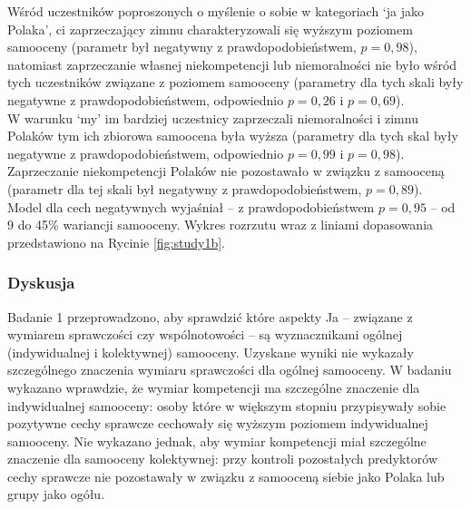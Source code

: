 \documentclass[man]{apa6}
\begin{document}
Wśród uczestników poproszonych o myślenie o sobie w kategoriach `ja jako Polaka', ci zaprzeczający zimnu charakteryzowali się wyższym poziomem samooceny (parametr był negatywny z prawdopodobieństwem, $p = 0,98$), natomiast zaprzeczanie własnej niekompetencji lub niemoralności nie było wśród tych uczestników związane z poziomem samooceny  (parametry dla tych skali były negatywne z prawdopodobieństwem, odpowiednio $p = 0,26$ i $p = 0,69$).\\

W warunku `my' im bardziej uczestnicy zaprzeczali niemoralności i zimnu Polaków tym ich zbiorowa samoocena była wyższa (parametry dla tych skal były negatywne z prawdopodobieństwem, odpowiednio $p = 0,99$ i $p = 0,98$). Zaprzeczanie niekompetencji Polaków nie pozostawało w związku z samooceną (parametr dla tej skali był negatywny z prawdopodobieństwem, $p = 0,89$).\\

Model dla cech negatywnych wyjaśniał -- z prawdopodobieństwem $p = 0,95$ -- od 9 do 45\% wariancji samooceny. Wykres rozrzutu wraz z liniami dopasowania przedstawiono na Rycinie \ref{fig:study1b}.


\begin{figure*}[htbp]
   \centering
   \caption{Autoaskrypcja negatywnych cech związanych w wymiarami kompetencji, moralności i ciepła, a poziom samooceny indywidualnej oraz kolektywnej. Punkty oznaczają latentne wyniki dla każdej osoby, z kreskami oznaczającymi błędy pomiarowe skal. Grubą linią przerywaną oznaczono najlepsze dopasowanie uzyskane w modelu regresyjnym, z cieńszymi liniami oznaczającymi błąd oszacowania.}
   \label{fig:study1b}
\end{figure*}

\subsubsection{Dyskusja}

Badanie 1 przeprowadzono, aby sprawdzić które aspekty Ja -- związane z wymiarem sprawczości czy wspólnotowości -- są wyznacznikami ogólnej (indywidualnej i kolektywnej) samooceny. Uzyskane wyniki nie wykazały szczególnego znaczenia wymiaru sprawczości dla ogólnej samooceny. W badaniu wykazano wprawdzie, że wymiar kompetencji ma szczególne znaczenie dla indywidualnej samooceny: osoby które w większym stopniu przypisywały sobie pozytywne cechy sprawcze cechowały się wyższym poziomem indywidualnej samooceny. Nie wykazano jednak, aby wymiar kompetencji miał szczególne znaczenie dla samooceny kolektywnej: przy kontroli pozostałych predyktorów cechy sprawcze nie pozostawały w związku z samooceną siebie jako Polaka lub grupy jako ogółu. \\
\end{document}

